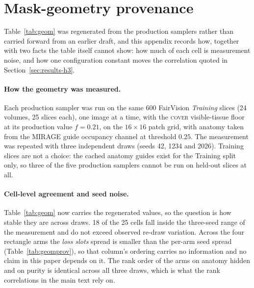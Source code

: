 \documentclass{article}
\begin{document}
\section{Mask-geometry provenance}
\label{app:geomprov}

Table~\ref{tab:geom} was regenerated from the production samplers rather than
carried forward from an earlier draft, and this appendix records how, together
with two facts the table itself cannot show: how much of each cell is
measurement noise, and how one configuration constant moves the correlation
quoted in Section~\ref{sec:results-h3}.

\paragraph{How the geometry was measured.} Each production sampler was run on
the same 600 FairVision \emph{Training} slices (24 volumes, 25 slices each),
one image at a time, with the \textsc{cover} visible-tissue floor at its
production value $f{=}0.21$, on the $16\times16$ patch grid, with anatomy taken
from the MIRAGE guide occupancy channel at threshold $0.25$. The measurement was
repeated with three independent draws (seeds 42, 1234 and 2026). Training slices
are not a choice: the cached anatomy guides exist for the Training split only,
so three of the five production samplers cannot be run on held-out slices at
all.

\paragraph{Cell-level agreement and seed noise.} Table~\ref{tab:geom} now carries
the regenerated values, so the question is how stable they are across draws.
18 of the 25 cells fall inside the three-seed range of the measurement and do
not exceed observed re-draw variation. Across the four rectangle arms the
\emph{loss slots} spread is smaller than the per-arm seed spread
(Table~\ref{tab:geomprov}), so that column's ordering carries no information and
no claim in this paper depends on it. The rank order of the arms on anatomy
hidden and on purity is identical across all three draws, which is what the
rank correlations in the main text rely on.
\end{document}
